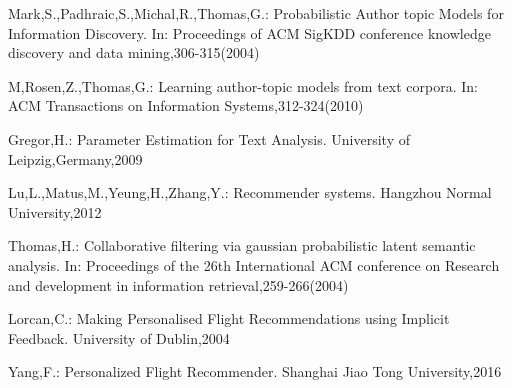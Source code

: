 \documentclass{llncs}
\begin{document}
\begin{thebibliography}{1}
Mark,S.,Padhraic,S.,Michal,R.,Thomas,G.:
Probabilistic Author topic Models for Information Discovery.
In: Proceedings of ACM SigKDD conference knowledge discovery and data mining,306-315(2004)

M,Rosen,Z.,Thomas,G.:
Learning author-topic models from text corpora.
In: ACM Transactions on Information Systems,312-324(2010)

Gregor,H.:
Parameter Estimation for Text Analysis.
University of Leipzig,Germany,2009

Lu,L.,Matus,M.,Yeung,H.,Zhang,Y.:
Recommender systems.
Hangzhou Normal University,2012

Thomas,H.:
Collaborative filtering via gaussian probabilistic latent semantic analysis.
In: Proceedings of the 26th International ACM conference on Research and development in information retrieval,259-266(2004)

Lorcan,C.:
Making Personalised Flight Recommendations using Implicit Feedback.
University of Dublin,2004

Yang,F.:
Personalized Flight Recommender.
Shanghai Jiao Tong University,2016

\end{thebibliography}
\end{document}
